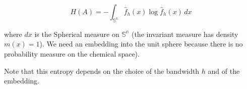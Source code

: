 \[ H(A) = -\int_\mathbb{{S}^n}  \hat{f}_h(x)\log  \hat{f}_h(x) \,dx  \]



where $dx$ is the Spherical measure on $\mathbb{{S}^n}$ (the invariant measure has density $m(x)=1$). We need an embedding into the unit sphere because there is no probability measure on the chemical space).

Note that this entropy depends on the choice of the bandwidth $h$ and of the embedding.

